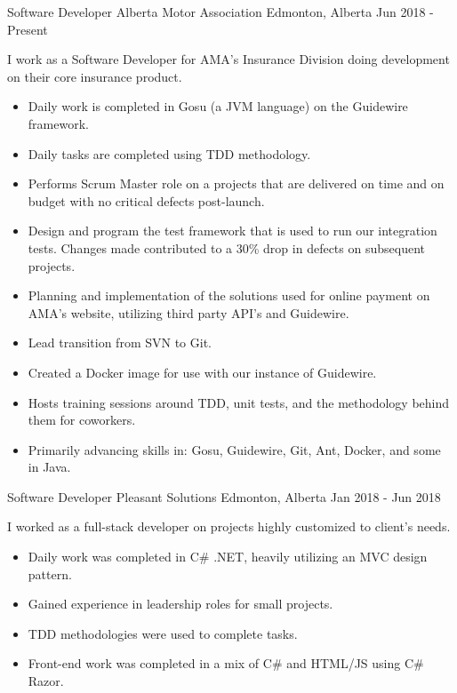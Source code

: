 
\begin{cventries}
    \cventry
        {Software Developer}
        {Alberta Motor Association}
        {Edmonton, Alberta}
        {Jun 2018 - Present}
        {
            I work as a Software Developer for AMA's Insurance Division doing development on their core insurance product.
            \begin{itemize}
                \item Daily work is completed in Gosu (a JVM language) on the Guidewire framework.
                \item Daily tasks are completed using TDD methodology.
                \item Performs Scrum Master role on a projects that are delivered on time and on budget with no critical defects post-launch.
                \item Design and program the test framework that is used to run our integration tests.  Changes made contributed to a 30\% drop in defects on subsequent projects.
                \item Planning and implementation of the solutions used for online payment on AMA's website, utilizing third party API's and Guidewire.
                \item Lead transition from SVN to Git.
                \item Created a Docker image for use with our instance of Guidewire.
                \item Hosts training sessions around TDD, unit tests, and the methodology behind them for coworkers.
                \item Primarily advancing skills in: Gosu, Guidewire, Git, Ant, Docker, and some in Java.
            \end{itemize}
        }
    \cventry
        {Software Developer}
        {Pleasant Solutions}
        {Edmonton, Alberta}
        {Jan 2018 - Jun 2018}
        {
            I worked as a full-stack developer on projects highly customized to client's needs.
            \begin{itemize}
                \item Daily work was completed in C\# .NET, heavily utilizing an MVC design pattern.
                \item Gained experience in leadership roles for small projects.
                \item TDD methodologies were used to complete tasks.
                \item Front-end work was completed in a mix of C\# and HTML/JS using C\# Razor.

\end{itemize}}
\end{cventries}
